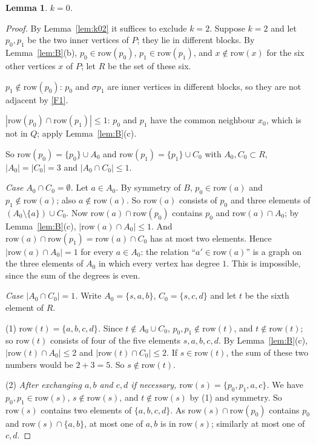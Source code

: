 \documentclass[11pt,a4paper]{article}
\newtheorem{lemma}[theorem]{Lemma}
\theoremstyle{remark}
\newcommand{\sg}{\sigma}
\begin{document}
\begin{lemma}\label{lem:k0}
$k=0$.
\end{lemma}
\begin{proof}
By Lemma~\ref{lem:k02} it suffices to exclude $k=2$. Suppose $k=2$ and let $p_0,p_1$ be the two inner vertices of
$P$; they lie in different blocks. By
Lemma~\ref{lem:B}(b), $p_0\in\mathrm{row}(p_0)$, $p_1\in\mathrm{row}(p_1)$, and $x\notin\mathrm{row}(x)$ for the six
other vertices $x$ of $P$; let $R$ be the set of these six.

\emph{$p_1\notin\mathrm{row}(p_0)$}: $p_0$ and $\sg p_1$ are inner vertices in different blocks, so they are not
adjacent by \ref{F1}.

\emph{$|\mathrm{row}(p_0)\cap\mathrm{row}(p_1)|\le1$}: $p_0$ and $p_1$ have the common neighbour $x_0$, which is not
in $Q$; apply Lemma~\ref{lem:B}(c).

So $\mathrm{row}(p_0)=\{p_0\}\cup A_0$ and $\mathrm{row}(p_1)=\{p_1\}\cup C_0$ with $A_0,C_0\subset R$,
$|A_0|=|C_0|=3$ and $|A_0\cap C_0|\le1$.

\medskip\noindent\emph{Case $A_0\cap C_0=\emptyset$.} Let $a\in A_0$. By symmetry of $B$, $p_0\in\mathrm{row}(a)$
and $p_1\notin\mathrm{row}(a)$; also $a\notin\mathrm{row}(a)$. So $\mathrm{row}(a)$ consists of $p_0$ and three
elements of $(A_0\setminus\{a\})\cup C_0$. Now $\mathrm{row}(a)\cap\mathrm{row}(p_0)$ contains $p_0$ and
$\mathrm{row}(a)\cap A_0$; by Lemma~\ref{lem:B}(c), $|\mathrm{row}(a)\cap A_0|\le1$. And
$\mathrm{row}(a)\cap\mathrm{row}(p_1)=\mathrm{row}(a)\cap C_0$ has at most two elements. Hence
$|\mathrm{row}(a)\cap A_0|=1$ for every $a\in A_0$: the relation ``$a'\in\mathrm{row}(a)$'' is a graph on the three
elements of $A_0$ in which every vertex has degree $1$. This is impossible, since the sum of the degrees is even.

\medskip\noindent\emph{Case $|A_0\cap C_0|=1$.} Write $A_0=\{s,a,b\}$, $C_0=\{s,c,d\}$ and let $t$ be the sixth
element of $R$.

(1) \emph{$\mathrm{row}(t)=\{a,b,c,d\}$.} Since $t\notin A_0\cup C_0$, $p_0,p_1\notin\mathrm{row}(t)$, and
$t\notin\mathrm{row}(t)$; so $\mathrm{row}(t)$ consists of four of the five elements $s,a,b,c,d$. By
Lemma~\ref{lem:B}(c), $|\mathrm{row}(t)\cap A_0|\le2$ and $|\mathrm{row}(t)\cap C_0|\le2$. If $s\in\mathrm{row}(t)$,
the sum of these two numbers would be $2+3=5$. So $s\notin\mathrm{row}(t)$.

(2) \emph{After exchanging $a,b$ and $c,d$ if necessary, $\mathrm{row}(s)=\{p_0,p_1,a,c\}$.} We have
$p_0,p_1\in\mathrm{row}(s)$, $s\notin\mathrm{row}(s)$, and $t\notin\mathrm{row}(s)$ by (1) and symmetry. So
$\mathrm{row}(s)$ contains two elements of $\{a,b,c,d\}$. As $\mathrm{row}(s)\cap\mathrm{row}(p_0)$ contains $p_0$
and $\mathrm{row}(s)\cap\{a,b\}$, at most one of $a,b$ is in $\mathrm{row}(s)$; similarly at most one of $c,d$.


\end{proof}
\end{document}
